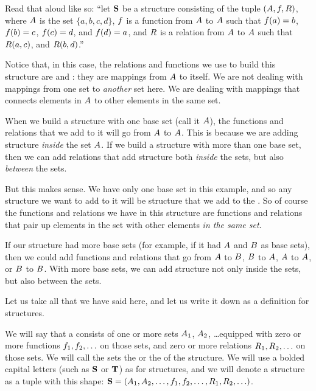 \documentclass[../../../main.tex]{subfiles}
\begin{document}
Read that aloud like so: ``let $\mathbf{S}$ be a structure consisting of the tuple $(A, f, R)$, where $A$ is the set $\{ a, b, c, d \}$, $f$ is a function from $A$ to $A$ such that $f(a) = b$, $f(b) = c$, $f(c) = d$, and $f(d) = a$, and $R$ is a relation from $A$ to $A$ such that $R(a, c)$, and $R(b, d)$.''

Notice that, in this case, the relations and functions we use to build this structure are  and : they are mappings from $A$ to itself. We are not dealing with mappings from one set to \emph{another} set here. We are dealing with mappings that connects elements in $A$ to other elements in the same set.

\begin{aside}
  \begin{remark}
    When we build a structure with one base set (call it $A$), the functions and relations that we add to it will go from $A$ to $A$. This is because we are adding structure \emph{inside} the set $A$. If we build a structure with more than one base set, then we can add relations that add structure both \emph{inside} the sets, but also \emph{between} the sets.
  \end{remark}
\end{aside}

But this makes sense. We have only one base set in this example, and so any structure we want to add to it will be structure that we add to the . So of course the functions and relations we have in this structure are functions and relations that pair up elements in the set with other elements \emph{in the same set}. 

If our structure had more base sets (for example, if it had $A$ and $B$ as base sets), then we could add functions and relations that go from $A$ to $B$, $B$ to $A$, $A$ to $A$, or $B$ to $B$. With more base sets, we can add structure not only inside the sets, but also between the sets.

Let us take all that we have said here, and let us write it down as a definition for structures.

\begin{fdefinition}[Structures]
  We will say that a  consists of one or more sets $A_{1}$, $A_{2}$, \ldots equipped with zero or more functions $f_{1}, f_{2}, \ldots$ on those sets, and zero or more relations $R_{1}, R_{2}, \ldots$ on those sets. We will call the sets the  or the  of the structure. We will use a bolded capital letters (such as $\mathbf{S}$ or $\mathbf{T}$) as  for structures, and we will denote a structure as a tuple with this shape: $\mathbf{S} = (A_{1}, A_{2}, \ldots, f_{1}, f_{2}, \ldots, R_{1}, R_{2}, \ldots)$.
\end{fdefinition}
\end{document}

